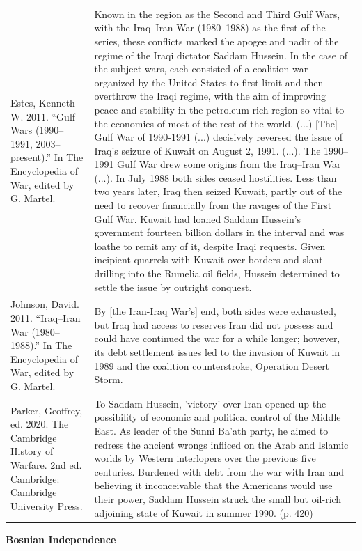 {\begin{longtable}{p{}p{}}
\\
Estes, Kenneth W. 2011. “Gulf Wars (1990–1991, 2003–present).” In The Encyclopedia of War, edited by G. Martel. & Known in the region as the Second and Third Gulf Wars, with the Iraq–Iran War (1980–1988) as the first of the series, these conflicts marked the apogee and nadir of the regime of the Iraqi dictator Saddam Hussein. In the case of the subject wars, each consisted of a coalition war organized by the United States to first limit and then overthrow the Iraqi regime, with the aim of improving peace and stability in the petroleum-rich region so vital to the economies of most of the rest of the world. (...) [The] Gulf War of 1990-1991 (...) decisively reversed the issue of Iraq's seizure of Kuwait on August 2, 1991. (...). The 1990–1991 Gulf War drew some origins from the Iraq–Iran War (...). In July 1988 both sides ceased hostilities. Less than two years later, Iraq then seized Kuwait, partly out of the need to recover financially from the ravages of the First Gulf War. Kuwait had loaned Saddam Hussein's government fourteen billion dollars in the interval and was loathe to remit any of it, despite Iraqi requests. Given incipient quarrels with Kuwait over borders and slant drilling into the Rumelia oil fields, Hussein determined to settle the issue by outright conquest.
\\
Johnson, David. 2011. “Iraq–Iran War (1980–1988).” In The Encyclopedia of War, edited by G. Martel. & By [the Iran-Iraq War's] end, both sides were exhausted, but Iraq had access to reserves Iran did not possess and could have continued the war for a while longer; however, its debt settlement issues led to the invasion of Kuwait in 1989 and the coalition counterstroke, Operation Desert Storm.
\\
Parker, Geoffrey, ed. 2020. The Cambridge History of Warfare. 2nd ed. Cambridge: Cambridge University Press. & To Saddam Hussein, 'victory' over Iran opened up the possibility of economic and political control of the Middle East. As leader of the Sunni Ba'ath party, he aimed to redress the ancient wrongs infliced on the Arab and Islamic worlds by Western interlopers over the previous five centuries. Burdened with debt from the war with Iran and believing it inconceivable that the Americans would use their power, Saddam Hussein struck the small but oil-rich adjoining state of Kuwait in summer 1990. (p. 420)
\\
\end{longtable}}
\clearpage
         \textbf{Bosnian Independence} 

